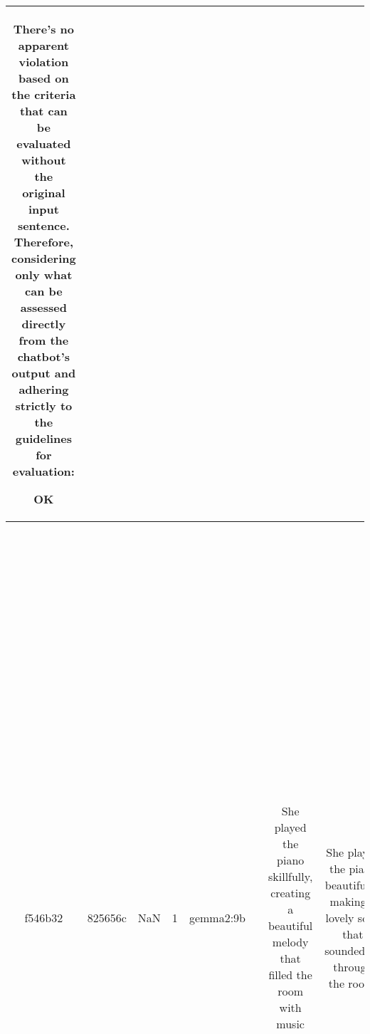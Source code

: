 \begin{table}[h!]
\begin{tabular}{|c|c|c|c|c|c|c|c|c|c|}
There's no apparent violation based on the criteria that can be evaluated without the original input sentence. Therefore, considering only what can be assessed directly from the chatbot's output and adhering strictly to the guidelines for evaluation:

OK\\
\hline
f546b32 & 825656c & NaN & 1 & gemma2:9b &  & She played the piano skillfully, creating a beautiful melody that filled the room with music & She played the piano beautifully, making a lovely song that sounded all through the room.  
 & ok & The given chatbot output is a sentence that has been rewritten to enhance its readability and make it sound more conversational. It appears to simplify complex phrases and uses language that's easy to relate to, creating a fluid structure. However, without knowing the original input sentence, we cannot verify if the original meaning and factual accuracy have been preserved. Nonetheless, based on the output alone, it seems to follow the instruction of improving individual sentences by using engaging wording and style.

OK\\
\hline
825656c & 825656c & NaN &  & qwen2.5:3b &  &  & Sure thing! Here's a simpler version of your sentence:

In the soft twilight light, a curious cat walked onto the old cobblestone path, its whiskers twitching with each little breeze. & ok & The chatbot output appears to be a rewritten sentence that aims to enhance readability and sound more conversational, which aligns with the description provided. The language used is simple and easy to relate to, and the structure of the sentence is fluid and engaging. There are no obvious violations of the description in terms of style, wording, or other elements that can be evaluated without knowing the input.

OK\\
\hline
825656c & 825656c &  &  & qwen2.5:3b &  &  & Sure thing! Here's a simpler version of your sentence:

In the soft twilight light, a curious cat walked onto the old cobblestone path, its whiskers twitching with each little breeze. & ok & The chatbot output appears to be a rewritten sentence that aims to enhance readability and sound more conversational, which aligns with the description provided. The language used is simple and easy to relate to, and the structure of the sentence is fluid and engaging. There are no obvious violations of the description in terms of style, wording, or other elements that can be evaluated without knowing the input.


\end{tabular}
\end{table}
